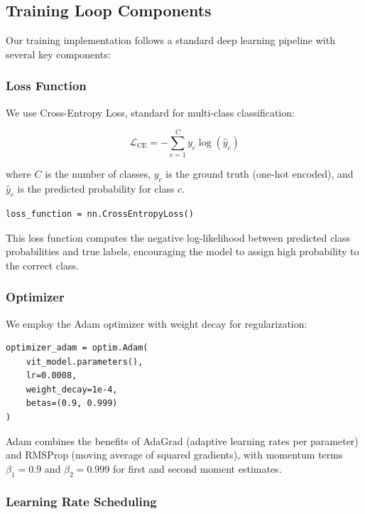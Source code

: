 \documentclass{article}
\begin{document}
\subsection{Training Loop Components}

Our training implementation follows a standard deep learning pipeline with several key components:

\subsubsection{Loss Function}

We use Cross-Entropy Loss, standard for multi-class classification:

\begin{equation}
\mathcal{L}_{\text{CE}} = -\sum_{c=1}^{C} y_c \log(\hat{y}_c)
\label{eq:cross_entropy}
\end{equation}

where $C$ is the number of classes, $y_c$ is the ground truth (one-hot encoded), and $\hat{y}_c$ is the predicted probability for class $c$.

\begin{lstlisting}[caption={Loss Function}]
loss_function = nn.CrossEntropyLoss()
\end{lstlisting}

This loss function computes the negative log-likelihood between predicted class probabilities and true labels, encouraging the model to assign high probability to the correct class.

\subsubsection{Optimizer}

We employ the Adam optimizer with weight decay for regularization:

\begin{lstlisting}[caption={Optimizer Configuration}]
optimizer_adam = optim.Adam(
    vit_model.parameters(), 
    lr=0.0008,
    weight_decay=1e-4,
    betas=(0.9, 0.999)
)
\end{lstlisting}

Adam combines the benefits of AdaGrad (adaptive learning rates per parameter) and RMSProp (moving average of squared gradients), with momentum terms $\beta_1=0.9$ and $\beta_2=0.999$ for first and second moment estimates.

\subsubsection{Learning Rate Scheduling}
\end{document}
